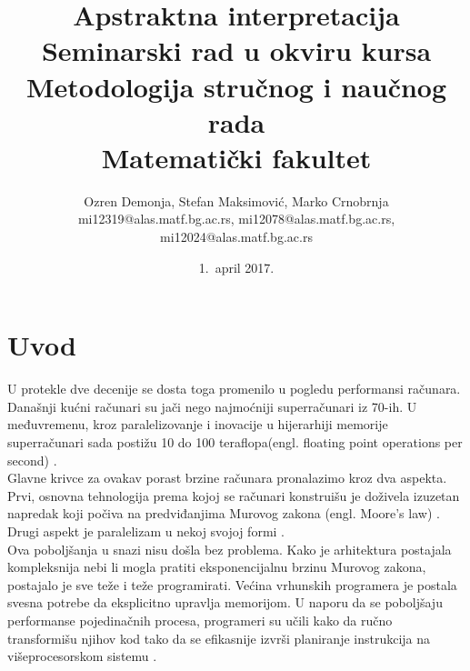 \documentclass[a4paper]{article}
\begin{document}
\title{Apstraktna interpretacija\\ \small{Seminarski rad u okviru kursa\\Metodologija stručnog i naučnog rada\\ Matematički fakultet}}

\author{Ozren Demonja, Stefan Maksimović, Marko Crnobrnja\\ mi12319@alas.matf.bg.ac.rs, mi12078@alas.matf.bg.ac.rs, mi12024@alas.matf.bg.ac.rs}
\date{1.~april 2017.}
\maketitle


\tableofcontents

\newpage

\section{Uvod}
\label{sec:uvod}
U protekle dve decenije se dosta toga promenilo u pogledu performansi računara. Današnji kućni računari su jači nego najmoćniji superračunari iz 70-ih. U međuvremenu, kroz paralelizovanje i inovacije u hijerarhiji memorije superračunari sada postižu 10 do 100 teraflopa(engl. floating point operations per second) \cite{allen2001optimizing}. \\

Glavne krivce za ovakav porast brzine računara pronalazimo kroz dva aspekta. Prvi, osnovna tehnologija prema kojoj se računari konstruišu je doživela izuzetan napredak koji počiva na predviđanjima Murovog zakona (engl. Moore's law) \cite{Schaller1997MooresLaw}. Drugi aspekt je paralelizam u nekoj svojoj formi \cite{allen2001optimizing}.  \\

Ova poboljšanja u snazi nisu došla bez problema. Kako je arhitektura postajala kompleksnija nebi li mogla pratiti eksponencijalnu brzinu Murovog zakona, postajalo je sve teže i teže programirati. Većina vrhunskih programera je postala svesna potrebe da eksplicitno upravlja memorijom. U naporu da se poboljšaju performanse pojedinačnih procesa, programeri su učili kako da ručno transformišu njihov kod tako da se efikasnije izvrši planiranje instrukcija na višeprocesorskom sistemu \cite{allen2001optimizing}. \\
\end{document}
